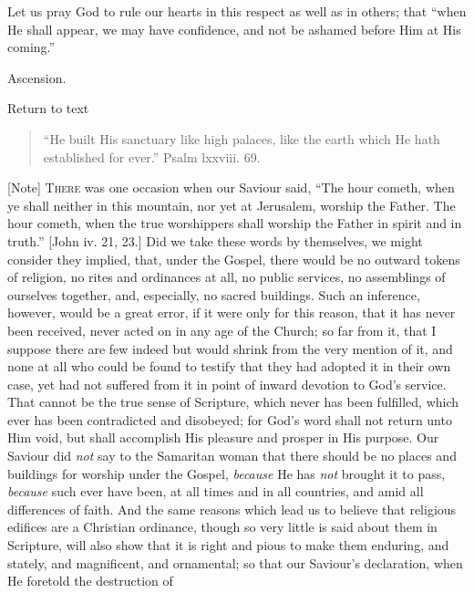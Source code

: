 Let us pray God to rule our hearts in this respect as well as in
others; that ``when He shall appear, we may have confidence, and
not be ashamed before Him at His coming.''


Ascension.

Return to text


\begin{quote}

``He built His sanctuary like high palaces, like the earth
which He hath established for ever.'' Psalm lxxviii. 69.

\end{quote}

[Note] T\textsc{here} was one occasion
when our Saviour said, ``The hour cometh, when ye shall neither in
this mountain, nor yet at Jerusalem, worship the Father. The hour
cometh, when the true worshippers shall worship the Father in spirit
and in truth.'' [John iv. 21, 23.] Did we take these words by
themselves, we might consider they implied, that, under the Gospel,
there would be no outward tokens of religion, no rites and ordinances
at all, no public services, no assemblings of ourselves together, and,
especially, no sacred buildings. Such an inference, however, would be
a great error, if it were only for this reason, that it has never been
received, never acted on in any age of the Church; so far from it,
that I suppose there are few indeed but would shrink from the very
mention of it, and none at all who could be found to testify that they
had adopted it in their own case, yet had not suffered from it in
point of inward devotion to God's service. That cannot be the true
sense of Scripture, which never has been fulfilled, which ever has
been contradicted and disobeyed; for God's word shall not return unto
Him void, but shall accomplish His pleasure and prosper in His
purpose. Our Saviour did \emph{not} say to the Samaritan woman that
there should be no places and buildings for worship under the Gospel, \emph{because}
He has \emph{not} brought it to pass, \emph{because} such ever have
been, at all times and in all countries, and amid all differences of
faith. And the same reasons which lead us to believe that religious
edifices are a Christian ordinance, though so very little is said
about them in Scripture, will also show that it is right and pious to
make them enduring, and stately, and magnificent, and ornamental; so
that our Saviour's declaration, when He foretold the destruction of
